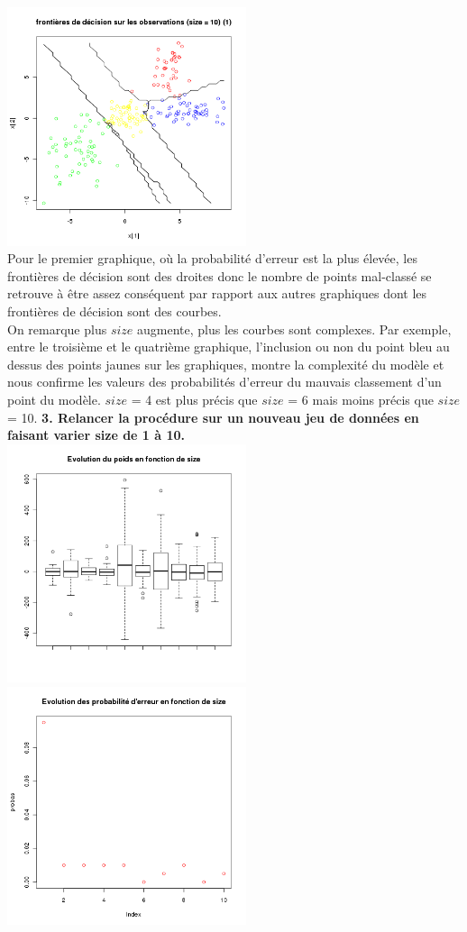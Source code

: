 \documentclass[a4paper, 10pt]{article}
\begin{document}
\includegraphics[height = 7cm, width = 7cm]{plots/frontiere_bayes_q3_2_10.png}\\
Pour le premier graphique, où la probabilité d'erreur est la plus élevée, les frontières de décision sont des droites donc le nombre de points mal-classé se retrouve à être assez conséquent par rapport aux autres graphiques dont les frontières de décision sont des courbes.\\
On remarque plus $size$ augmente, plus les courbes sont complexes. Par exemple, entre le troisième et le quatrième graphique, l'inclusion ou non du point bleu au dessus des points jaunes sur les graphiques, montre la complexité du modèle et nous confirme les valeurs des probabilités d'erreur du mauvais classement d'un point du modèle. $size$ = 4 est plus précis que $size$ = 6 mais moins précis que $size$ = 10. 
\textbf{3. Relancer la procédure sur un nouveau jeu de données en faisant varier size de 1 à 10.}\\
\includegraphics[height = 7cm, width = 7cm]{plots/poids_q3_3.png}
\includegraphics[height = 7cm, width = 7cm]{plots/probas_erreur_q3_3.png}\\
\end{document}
